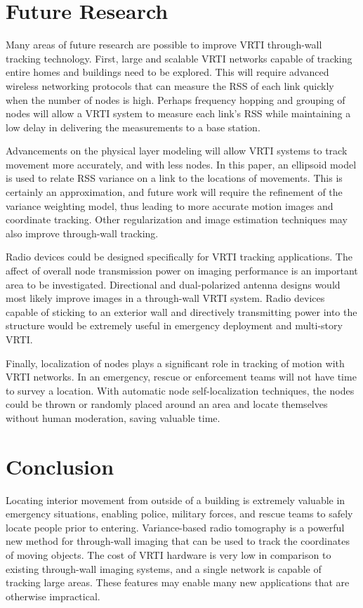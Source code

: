 \documentclass[journal]{IEEEtran}
\begin{document}
\section{Future Research}\label{section.futureResearch}

Many areas of future research are possible to improve VRTI through-wall tracking technology. First, large and scalable VRTI networks capable of tracking entire homes and buildings need to be explored. This will require advanced wireless networking protocols that can measure the RSS of each link quickly when the number of nodes is high. Perhaps frequency hopping and grouping of nodes will allow a VRTI system to measure each link's RSS while maintaining a low delay in delivering the measurements to a base station.

Advancements on the physical layer modeling will allow VRTI systems to track movement more accurately, and with less nodes.  In this paper, an ellipsoid model is used to relate RSS variance on a link to the locations of movements.  This is certainly an approximation, and future work will require the refinement of the variance weighting model, thus leading to more accurate motion images and coordinate tracking. Other regularization and image estimation techniques may also improve through-wall tracking.

Radio devices could be designed specifically for VRTI tracking applications. The affect of overall node transmission power on imaging performance is an important area to be investigated. Directional and dual-polarized antenna designs would most likely improve images in a through-wall VRTI system. Radio devices capable of sticking to an exterior wall and directively transmitting power into the structure would be extremely useful in emergency deployment and multi-story VRTI.

Finally, localization of nodes plays a significant role in tracking of motion with VRTI networks. In an emergency, rescue or enforcement teams will not have time to survey a location. With automatic node self-localization techniques, the nodes could be thrown or randomly placed around an area and locate themselves without human moderation, saving valuable time.

\section{Conclusion}
Locating interior movement from outside of a building is extremely valuable in emergency situations, enabling police, military forces, and rescue teams to safely locate people prior to entering.  Variance-based radio tomography is a powerful new method for through-wall imaging that can be used to track the coordinates of moving objects. The cost of VRTI hardware is very low in comparison to existing through-wall imaging systems, and a single network is capable of tracking large areas. These features may enable many new applications that are otherwise impractical.
\end{document}
